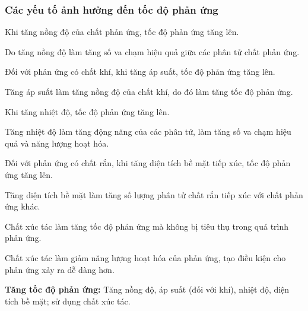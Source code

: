 \documentclass[Main.tex]{subfiles}
\begin{document}
	\subsubsection{Các yếu tố ảnh hưởng đến tốc độ phản ứng}
	\begin{ghinho}
		Khi tăng nồng độ của chất phản ứng, tốc độ phản ứng tăng lên.
		
		Do tăng nồng độ làm tăng số va chạm hiệu quả giữa các phân tử chất phản ứng.
	\end{ghinho}
	\begin{ghinho}
		Đối với phản ứng có chất khí, khi tăng áp suất, tốc độ phản ứng tăng lên.
		
		Tăng áp suất làm tăng nồng độ của chất khí, do đó làm tăng tốc độ phản ứng.
	\end{ghinho}
	\begin{ghinho}
		Khi tăng nhiệt độ, tốc độ phản ứng tăng lên.
		
		Tăng nhiệt độ làm tăng động năng của các phân tử, làm tăng số va chạm hiệu quả và năng lượng hoạt hóa.
	\end{ghinho}
	\begin{ghinho}
		 Đối với phản ứng có chất rắn, khi tăng diện tích bề mặt tiếp xúc, tốc độ phản ứng tăng lên.
		
		Tăng diện tích bề mặt làm tăng số lượng phân tử chất rắn tiếp xúc với chất phản ứng khác.
	\end{ghinho}
	\begin{ghinho}
		Chất xúc tác làm tăng tốc độ phản ứng mà không bị tiêu thụ trong quá trình phản ứng.
		
		Chất xúc tác làm giảm năng lượng hoạt hóa của phản ứng, tạo điều kiện cho phản ứng xảy ra dễ dàng hơn.
	\end{ghinho}
	\begin{tomtat}
		\textbf{Tăng tốc độ phản ứng:} Tăng nồng độ, áp suất (đối với khí), nhiệt độ, diện tích bề mặt; sử dụng chất xúc tác.
	\end{tomtat}
\end{document}
